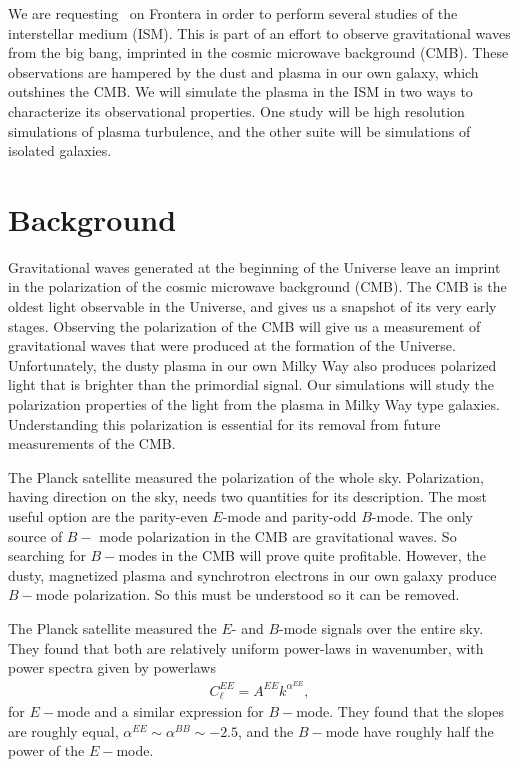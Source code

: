 
We are requesting \request\ on Frontera in order to perform several studies of
the interstellar medium (ISM).  This is part of an effort to observe
gravitational waves from the big bang, imprinted in the cosmic microwave background (CMB).  These observations are hampered by the
dust and plasma in our own galaxy, which outshines the CMB.  We will simulate
the plasma in the ISM in two ways to characterize its observational properties.
One study will be high resolution simulations of plasma turbulence, and the
other suite will be simulations of isolated galaxies.

\section{Background}

Gravitational waves generated at
the beginning of the Universe leave an imprint in the polarization of the cosmic
microwave background (CMB).  The CMB is the oldest light observable in the
Universe, and gives us a snapshot of its very early stages.
Observing the polarization of the CMB will give us a measurement of
gravitational waves that were produced at the formation of the Universe.
Unfortunately, the dusty plasma in our own Milky Way also produces polarized
light that is brighter than the primordial signal.  Our simulations will study
the polarization properties of the light from the plasma in Milky Way type
galaxies.  Understanding this polarization is essential for its removal from
future measurements of the CMB.

The Planck satellite measured the polarization of the whole sky.  Polarization,
having direction on the sky, needs two quantities for its description. The most
useful option are the parity-even $E$-mode and parity-odd $B$-mode.  
The only source of $B-$ mode polarization in the CMB are gravitational waves.
So searching for $B-$modes in the CMB will prove quite profitable.  However, the
dusty, magnetized plasma and synchrotron electrons in our own galaxy produce
$B-$mode polarization.  So this must be understood so it can be removed.  

The Planck satellite measured the $E$- and $B$-mode signals over the entire sky.
They found that both are relatively uniform power-laws in wavenumber, with power
spectra given by powerlaws
\begin{align}
C_\ell^{EE} = A^{EE} k^{\alpha^{EE}},
\end{align}
for $E-$mode and a similar expression for $B-$mode.  They found that the slopes
are roughly equal, $\alpha^{EE}\sim\alpha^{BB}\sim-2.5$, and the $B-$mode have
roughly half the power of the $E-$mode.  

